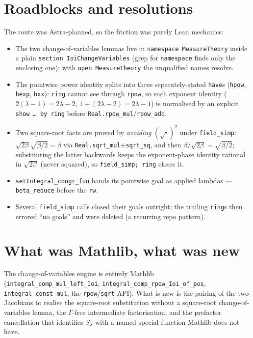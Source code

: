 \documentclass[11pt]{article}
\begin{document}
\section{Roadblocks and resolutions}
The route was Astra-planned, so the friction was purely Lean mechanics:
\begin{itemize}
\item The two change-of-variables lemmas live in \texttt{namespace MeasureTheory} inside a plain
\texttt{section IoiChangeVariables} (grep for \texttt{namespace} finds only the enclosing one); with
\texttt{open MeasureTheory} the unqualified names resolve.
\item The pointwise power identity splits into three separately-stated \texttt{have}s
(\texttt{hpow}, \texttt{hexp}, \texttt{hxx}): \texttt{ring} cannot see through \texttt{rpow}, so each
exponent identity ($2(\lambda-1)=2\lambda-2$, $1+(2\lambda-2)=2\lambda-1$) is normalised by an
explicit \texttt{show \ldots\ by ring} before \texttt{Real.rpow\_mul}/\texttt{rpow\_add}.
\item Two square-root facts are proved by \emph{avoiding} $(\sqrt{\cdot})^2$ under \texttt{field\_simp}:
$\sqrt{2\beta}\sqrt{\beta/2}=\beta$ via \texttt{Real.sqrt\_mul}$+$\texttt{sqrt\_sq}, and then
$\beta/\sqrt{2\beta}=\sqrt{\beta/2}$; substituting the latter backwards keeps the exponent-phase
identity rational in $\sqrt{2\beta}$ (never squared), so \texttt{field\_simp; ring} closes it.
\item \texttt{setIntegral\_congr\_fun} hands its pointwise goal as applied lambdas ---
\texttt{beta\_reduce} before the \texttt{rw}.
\item Several \texttt{field\_simp} calls closed their goals outright; the trailing \texttt{ring}s then
errored ``no goals'' and were deleted (a recurring repo pattern).
\end{itemize}

\section{What was Mathlib, what was new}
The change-of-variables engine is entirely Mathlib (\texttt{integral\_comp\_mul\_left\_Ioi},
\texttt{integral\_comp\_rpow\_Ioi\_of\_pos}, \texttt{integral\_const\_mul}, the \texttt{rpow}/\texttt{sqrt}
API). What is new is the pairing of the two Jacobians to realise the square-root substitution without a
square-root change-of-variables lemma, the $\Gamma$-free intermediate factorisation, and the
prefactor cancellation that identifies $S_\lambda$ with a named special function Mathlib does not have.
\end{document}
